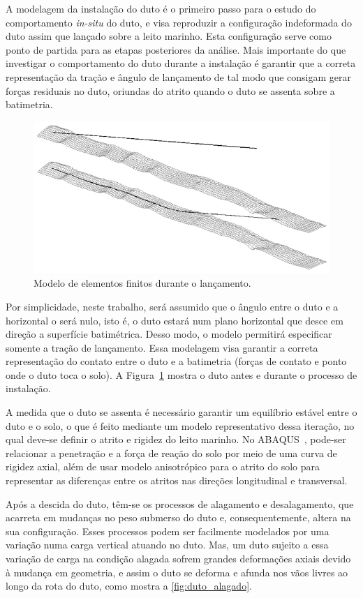 A modelagem da instalação do duto é o primeiro passo para o estudo do comportamento \textit{in-situ} do duto, e visa reproduzir a configuração indeformada do duto assim que lançado sobre a leito marinho.
Esta configuração serve como ponto de partida para as etapas posteriores da análise.
Mais importante do que investigar o comportamento do duto durante a instalação é garantir que a correta representação da tração e ângulo de lançamento de tal modo que consigam gerar forças residuais no duto, oriundas do atrito quando o duto se assenta sobre a batimetria.

\begin{figure}[!ht]
    \centering
    \caption{Modelo de elementos finitos durante o lançamento.}\label{fig:lancamentododuto}
    \includegraphics[width=0.7\linewidth]{imagens/lancamento_do_duto}
\end{figure}

Por simplicidade, neste trabalho, será assumido que o ângulo entre o duto e a horizontal o será nulo, isto é, o duto estará num plano horizontal que desce em direção a superfície batimétrica.
Desso modo, o modelo permitirá especificar somente a tração de lançamento.
Essa modelagem visa garantir a correta representação do contato entre o duto e a batimetria (forças de contato e ponto onde o duto toca o solo).
A Figura~\ref{fig:lancamentododuto} mostra o duto antes e durante o processo de instalação.

A medida que o duto se assenta é necessário garantir um equilíbrio estável entre o duto e o solo, o que é feito mediante um modelo representativo dessa iteração, no qual deve-se definir o atrito e rigidez do leito marinho.
No ABAQUS~\cite{Dassault2018}, pode-ser relacionar a penetração e a força de reação do solo por meio de uma curva de rigidez axial, além de usar modelo anisotrópico para o atrito do solo para representar as diferenças entre os atritos nas direções longitudinal e transversal.

Após a descida do duto, têm-se os processos de alagamento e desalagamento, que acarreta em mudanças no peso submerso do duto e, consequentemente, altera na sua configuração.
Esses processos podem ser facilmente modelados por uma variação numa carga vertical atuando no duto.
Mas, um duto sujeito a essa variação de carga na condição alagada sofrem grandes deformações axiais devido à mudança em geometria, e assim o duto se deforma e afunda nos vãos livres ao longo da rota do duto, como mostra a \autoref{fig:duto_alagado}.

